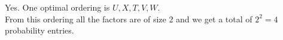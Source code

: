 \documentclass[addpoints, answers, 11pt, a4paper]{exam}
\begin{document}
\begin{questions}
\begin{parts}
				\begin{solution}
					Yes.
					One optimal ordering is $U, X, T, V, W$. \\
					From this ordering all the factors are of size 2 and we get a total of $2^2 = 4$ probability entries.
				\end{solution} \vspace{1em}
			\end{parts}
	
	\end{questions}
\end{document}

